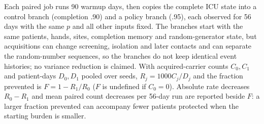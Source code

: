 Each paired job runs 90 warmup days, then copies the complete ICU state into a
control branch (completion .90) and a policy branch (.95), each observed for 56
days with the same $p$ and all other inputs fixed. The branches start with the
same patients, hands, sites, completion memory and random-generator state, but
acquisitions can change screening, isolation and later contacts and can separate
the random-number sequences, so the branches do not keep identical event
histories; no variance reduction is claimed. With acquired-carrier counts
$C_0,C_1$ and patient-days $D_0,D_1$ pooled over seeds, $R_j=1000C_j/D_j$ and the
fraction prevented is $F=1-R_1/R_0$ ($F$ is undefined if $C_0=0$). Absolute rate
decreases $R_0-R_1$ and mean paired count decreases per 56-day run are reported
beside $F$: a larger fraction prevented can accompany fewer patients protected
when the starting burden is smaller.

